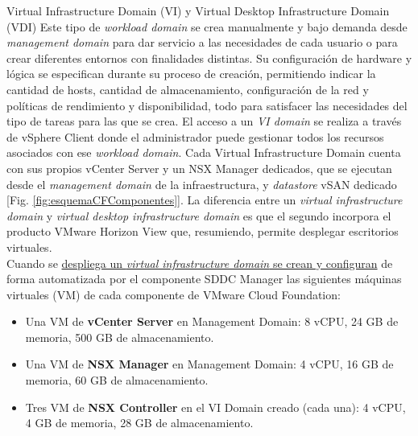 \begin{subsubsection}{Virtual Infrastructure Domain (VI) y Virtual Desktop Infrastructure Domain (VDI)}
\label{subsubsec:domainVI}
Este tipo de \textit{workload domain} se crea manualmente y bajo demanda desde \textit{management domain} para dar servicio a las necesidades de cada usuario o para crear diferentes entornos con finalidades distintas. Su configuración de hardware y lógica se especifican durante su proceso de creación, permitiendo indicar la cantidad de hosts, cantidad de almacenamiento, configuración de la red y políticas de rendimiento y disponibilidad, todo para satisfacer las necesidades del tipo de tareas para las que se crea. El acceso a un \textit{VI domain} se realiza a través de vSphere Client donde el administrador puede gestionar todos los recursos asociados con ese \textit{workload domain}. Cada Virtual Infrastructure Domain cuenta con sus propios vCenter Server y un NSX Manager dedicados, que se ejecutan desde el \textit{management domain} de la infraestructura, y \textit{datastore} vSAN dedicado [Fig. \ref{fig:esquemaCFComponentes}]. La diferencia entre un \textit{virtual infrastructure domain} y \textit{virtual desktop infrastructure domain} es que el segundo incorpora el producto VMware Horizon View que, resumiendo, permite desplegar escritorios virtuales.\\
Cuando se \underline{despliega un \textit{virtual infrastructure domain} se crean y configuran} de forma automatizada por el componente SDDC Manager las siguientes máquinas virtuales (VM) de cada componente de VMware Cloud Foundation:
\begin{itemize}
    \item Una VM de \textbf{vCenter Server} en Management Domain: 8 vCPU, 24 GB de memoria, 500 GB de almacenamiento.
    \item Una VM de \textbf{NSX Manager} en Management Domain: 4 vCPU, 16 GB de memoria, 60 GB de almacenamiento.
    \item Tres VM de \textbf{NSX Controller} en el VI Domain creado (cada una):  4 vCPU, 4 GB de memoria, 28 GB de almacenamiento.
\end{itemize}

\end{subsubsection}
